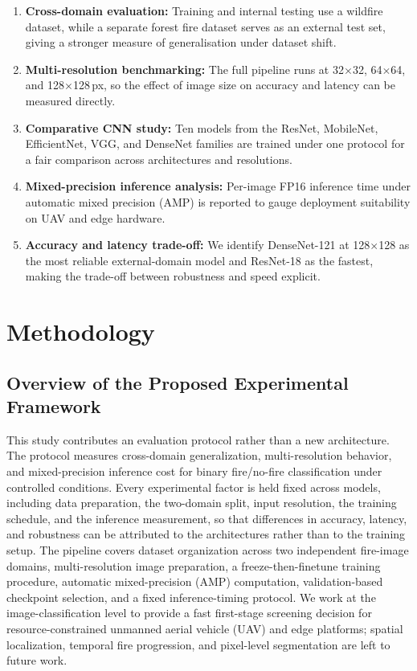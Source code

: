 \documentclass[conference]{IEEEtran}
\begin{document}
\begin{enumerate}
    \item \textbf{Cross-domain evaluation:} Training and internal testing use a wildfire dataset, while a separate forest fire dataset serves as an external test set, giving a stronger measure of generalisation under dataset shift.

    \item \textbf{Multi-resolution benchmarking:} The full pipeline runs at 32$\times$32, 64$\times$64, and 128$\times$128\,px, so the effect of image size on accuracy and latency can be measured directly.

    \item \textbf{Comparative CNN study:} Ten models from the ResNet, MobileNet, EfficientNet, VGG, and DenseNet families are trained under one protocol for a fair comparison across architectures and resolutions.

    \item \textbf{Mixed-precision inference analysis:} Per-image FP16 inference time under automatic mixed precision (AMP) is reported to gauge deployment suitability on UAV and edge hardware.

    \item \textbf{Accuracy and latency trade-off:} We identify DenseNet-121 at 128$\times$128 as the most reliable external-domain model and ResNet-18 as the fastest, making the trade-off between robustness and speed explicit.
\end{enumerate}



\section{Methodology}

\subsection{Overview of the Proposed Experimental Framework}

This study contributes an evaluation protocol rather than a new architecture. The protocol measures cross-domain generalization, multi-resolution behavior, and mixed-precision inference cost for binary fire/no-fire classification under controlled conditions. Every experimental factor is held fixed across models, including data preparation, the two-domain split, input resolution, the training schedule, and the inference measurement, so that differences in accuracy, latency, and robustness can be attributed to the architectures rather than to the training setup. The pipeline covers dataset organization across two independent fire-image domains, multi-resolution image preparation, a freeze-then-finetune training procedure, automatic mixed-precision (AMP) computation, validation-based checkpoint selection, and a fixed inference-timing protocol. We work at the image-classification level to provide a fast first-stage screening decision for resource-constrained unmanned aerial vehicle (UAV) and edge platforms; spatial localization, temporal fire progression, and pixel-level segmentation are left to future work.
\end{document}
